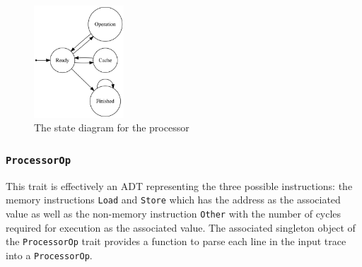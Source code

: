 \documentclass[nonacm,acmsmall,screen,11pt]{acmart}
\begin{document}
\begin{figure}[hptb]
  \centering
  \includegraphics[width=0.3\textwidth]{processor}
  \caption{The state diagram for the processor}
  \label{fig:processor}
\end{figure}

\subsubsection{\texttt{ProcessorOp}}
This trait is effectively an ADT representing the three possible instructions: the memory instructions \texttt{Load} and \texttt{Store} which has the address as the associated value as well as the non-memory instruction \texttt{Other} with the number of cycles required for execution as the associated value.
The associated singleton object of the \texttt{ProcessorOp} trait provides a function to parse each line in the input trace into a \texttt{ProcessorOp}.
\end{document}
